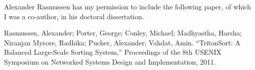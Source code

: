 Alexander Rasmussen has my permission to include the following paper, of which
I was a co-author, in his doctoral dissertation.

Rasmussen, Alexander; Porter, George; Conley, Michael; Madhyastha, Harsha;
Niranjan Mysore, Radhika; Pucher, Alexander; Vahdat, Amin. ``TritonSort: A
Balanced Large-Scale Sorting System,'' Proceedings of the 8th USENIX Symposium
on Networked Systems Design and Implementation, 2011.

